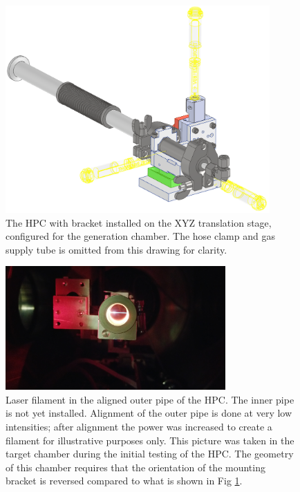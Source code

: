 \begin{figure}
	\centering
	\includegraphics[width=0.9\textwidth]{figures/app1/HPC_on_stage2.png}
	\caption{The HPC with bracket installed on the XYZ translation stage, configured for the generation chamber. The hose clamp and gas supply tube is omitted from this drawing for clarity.}
	\label{fig:HPC_on_stage}
\end{figure}

\begin{figure}
	\centering
	\includegraphics[width=0.75\textwidth]{figures/app1/HPC_outer_can_laser.jpg}
	\caption{Laser filament in the aligned outer pipe of the HPC. The inner pipe is not yet installed. Alignment of the outer pipe is done at very low intensities; after alignment the power was increased to create a filament for illustrative purposes only. This picture was taken in the target chamber during the initial testing of the HPC. The geometry of this chamber requires that the orientation of the mounting bracket is reversed compared to what is shown in Fig \ref{fig:HPC_on_stage}.}
	\label{fig:HPC_outer_can_laser}
\end{figure}

